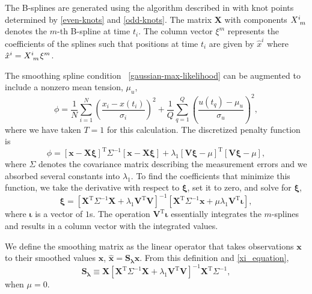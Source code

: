 \documentclass{ametsoc}
\begin{document}
\label{appendixA:numerical_implementation}

The B-splines are generated using the algorithm described in \citet{deboor1978-book} with knot points determined by  \eqref{even-knots} and \eqref{odd-knots}. The matrix $\mathbf{X}$ with components $X\indices{^i_m}$ denotes the $m$-th B-spline at time $t_i$. The column vector $\xi^m$ represents the coefficients of the splines such that positions at time $t_i$ are given by $\hat{x}^i$ where $\hat{x}^i =  X\indices{^i_m} \xi^m$.

The smoothing spline condition~ \eqref{gaussian-max-likelihood} can be augmented to include a nonzero mean tension, $\mu_u$,
\begin{equation}
\phi =  \frac{1}{N} \sum^N _{i=1}\left( \frac{x_i - x(t_i)}{\sigma_i} \right)^2 + \frac{1}{Q} \sum^{Q}_{q=1}  \left(  \frac{u(t_q)-\mu_u}{\sigma_u} \right)^2,
\end{equation}
where we have taken $T=1$ for this calculation. The discretized penalty function is
\begin{equation}
\phi = \left[ \mathbf{x} - \mathbf{X} \mathbf{\xi} \right]^{\textrm{T}} \Sigma^{-1} \left[ \mathbf{x} - \mathbf{X} \mathbf{\xi}\right]
+ \lambda_1 \left[\mathbf{V}\mathbf{\xi} - \mu \right]^{\textrm{T}} \left[ \mathbf{V}\mathbf{\xi} - \mu \right],
\end{equation}
where $\Sigma$ denotes the covariance matrix describing the measurement errors and we absorbed several constants into $\lambda_1$. To find the coefficients that minimize this function, we take the derivative with respect to $\mathbf{\xi}$, set it to zero, and solve for $\mathbf{\xi}$,
\begin{equation}
\label{xi_equation}
\mathbf{\xi} = \left[ \mathbf{X}^{\textrm{T}} \Sigma^{-1} \mathbf{X} + \lambda_1 \mathbf{V}^{\textrm{T}} \mathbf{V} \right]^{-1}   \left[ \mathbf{X}^{\textrm{T}} \Sigma^{-1} \mathbf{x} +  \mu \lambda_1 \mathbf{V}^{\textrm{T}} \mathbf{\iota} \right],
\end{equation}
where $\mathbf{\iota}$ is a vector of $1$s. The operation $\mathbf{V}^{\textrm{T}} \mathbf{\iota}$ essentially integrates the $m$-splines and results in a column vector with the integrated values.

We define the smoothing matrix as the linear operator that takes observations $\mathbf{x}$ to their smoothed values $\mathbf{\hat{x}}$,
$
\mathbf{\hat{x}} = \mathbf{S_\lambda} \mathbf{x}.
$
From this definition and \eqref{xi_equation},
\begin{equation}
\label{smoothing-operator}
\mathbf{S_\lambda} \equiv \mathbf{X} \left[ \mathbf{X}^{\textrm{T}} \Sigma^{-1} \mathbf{X} + \lambda_1 \mathbf{V}^{\textrm{T}} \mathbf{V} \right]^{-1} \mathbf{X}^{\textrm{T}} \Sigma^{-1},
\end{equation}
when $\mu=0$.
\end{document}
